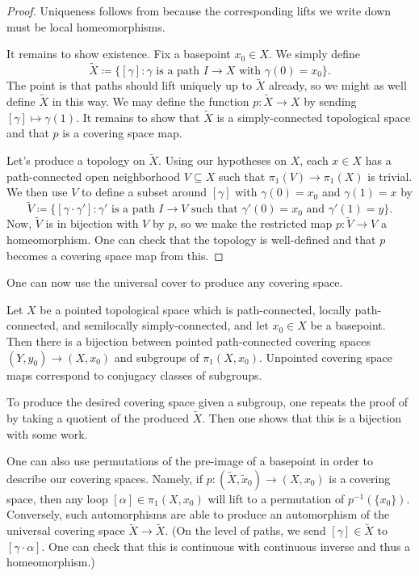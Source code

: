 \documentclass[../notes.tex]{subfiles}
\begin{document}
\begin{proof}
	Uniqueness follows from  because the corresponding lifts we write down must be local homeomorphisms.

	It remains to show existence. Fix a basepoint $x_0\in X$. We simply define
	\[\widetilde X\coloneqq\{[\gamma]:\gamma\text{ is a path }I\to X\text{ with }\gamma(0)=x_0\}.\]
	The point is that paths should lift uniquely up to $\widetilde X$ already, so we might as well define $\widetilde X$ in this way. We may define the function $p\colon\widetilde X\to X$ by sending $[\gamma]\mapsto\gamma(1)$. It remains to show that $\widetilde X$ is a simply-connected topological space and that $p$ is a covering space map.

	Let's produce a topology on $\widetilde X$. Using our hypotheses on $X$, each $x\in X$ has a path-connected open neighborhood $V\subseteq X$ such that $\pi_1(V)\to\pi_1(X)$ is trivial. We then use $V$ to define a subset around $[\gamma]$ with $\gamma(0)=x_0$ and $\gamma(1)=x$ by
	\[\widetilde V\coloneqq\{[\gamma\cdot\gamma']:\gamma'\text{ is a path }I\to V\text{ such that }\gamma'(0)=x_0\text{ and }\gamma'(1)=y\}.\]
	Now, $\widetilde V$ is in bijection with $V$ by $p$, so we make the restricted map $p\colon\widetilde V\to V$ a homeomorphism. One can check that the topology is well-defined and that $p$ becomes a covering space map from this.
\end{proof}
One can now use the universal cover to produce any covering space.
\begin{theorem}
	Let $X$ be a pointed topological space which is path-connected, locally path-connected, and semilocally simply-connected, and let $x_0\in X$ be a basepoint. Then there is a bijection between pointed path-connected covering spaces $(Y,y_0)\to(X,x_0)$ and subgroups of $\pi_1(X,x_0)$. Unpointed covering space maps correspond to conjugacy classes of subgroups.
\end{theorem}
To produce the desired covering space given a subgroup, one repeats the proof of  by taking a quotient of the produced $\widetilde X$. Then one shows that this is a bijection with some work.
\begin{remark}
	One can also use permutations of the pre-image of a basepoint in order to describe our covering spaces. Namely, if $p\colon(\widetilde X,\widetilde x_0)\to(X,x_0)$ is a covering space, then any loop $[\alpha]\in\pi_1(X,x_0)$ will lift to a permutation of $p^{-1}(\{x_0\})$. Conversely, such automorphisms are able to produce an automorphism of the universal covering space $\widetilde X\to\widetilde X$. (On the level of paths, we send $[\gamma]\in\widetilde X$ to $[\gamma\cdot\alpha]$. One can check that this is continuous with continuous inverse and thus a homeomorphism.) 
\end{remark}
\end{document}
